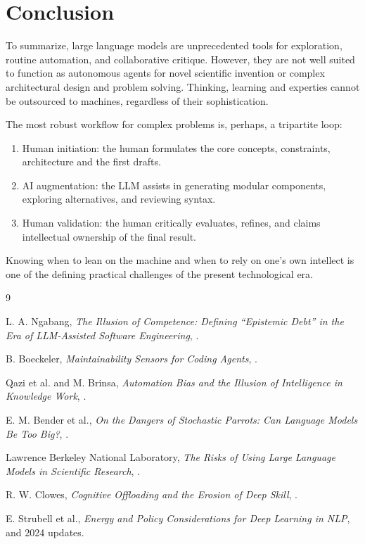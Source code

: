 \documentclass[10pt,a4paper]{article}
\begin{document}
\section{Conclusion}
To summarize, large language models are unprecedented tools for exploration, routine automation, and collaborative critique. However, they are not well suited to function as autonomous agents for novel scientific invention or complex architectural design and problem solving. Thinking, learning and experties cannot be outsourced to machines, regardless of their sophistication.

The most robust workflow for complex problems is, perhaps, a tripartite loop:

\begin{enumerate}
\item Human initiation: the human formulates the core concepts, constraints, architecture and the first drafts.
\item AI augmentation: the LLM assists in generating modular components, exploring alternatives, and reviewing syntax.
\item Human validation: the human critically evaluates, refines, and claims intellectual ownership of the final result.
\end{enumerate}

Knowing when to lean on the machine and when to rely on one's own intellect is one of the defining practical challenges of the present technological era.

\begin{thebibliography}{9}

L. A. Ngabang,
\newblock \emph{The Illusion of Competence: Defining ``Epistemic Debt'' in the Era of LLM-Assisted Software Engineering},
.

B. Boeckeler,
\newblock \emph{Maintainability Sensors for Coding Agents},
.

Qazi et al. and M. Brinsa,
\newblock \emph{Automation Bias and the Illusion of Intelligence in Knowledge Work},
.

E. M. Bender et al.,
\newblock \emph{On the Dangers of Stochastic Parrots: Can Language Models Be Too Big?},
.

Lawrence Berkeley National Laboratory,
\newblock \emph{The Risks of Using Large Language Models in Scientific Research},
.

R. W. Clowes,
\newblock \emph{Cognitive Offloading and the Erosion of Deep Skill},
.

E. Strubell et al.,
\newblock \emph{Energy and Policy Considerations for Deep Learning in NLP},
 and 2024 updates.

\end{thebibliography}
\end{document}
